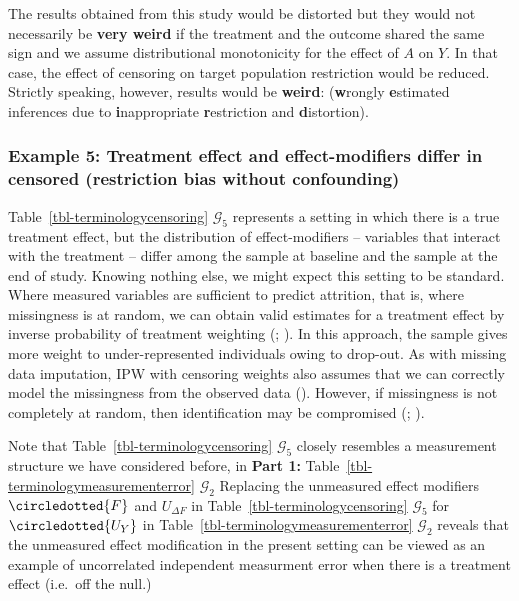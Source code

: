 \documentclass[
  single column]{article}
\begin{document}
The results obtained from this study would be distorted but they would
not necessarily be \textbf{very weird} if the treatment and the outcome
shared the same sign and we assume distributional monotonicity for the
effect of \(A\) on \(Y\). In that case, the effect of censoring on
target population restriction would be reduced. Strictly speaking,
however, results would be \textbf{weird}: (\textbf{w}rongly
\textbf{e}stimated inferences due to \textbf{i}nappropriate
\textbf{r}estriction and \textbf{d}istortion).

\subsubsection{Example 5: Treatment effect and effect-modifiers differ
in censored (restriction bias without
confounding)}\label{example-5-treatment-effect-and-effect-modifiers-differ-in-censored-restriction-bias-without-confounding}

Table~\ref{tbl-terminologycensoring} \(\mathcal{G}_5\) represents a
setting in which there is a true treatment effect, but the distribution
of effect-modifiers -- variables that interact with the treatment --
differ among the sample at baseline and the sample at the end of study.
Knowing nothing else, we might expect this setting to be standard. Where
measured variables are sufficient to predict attrition, that is, where
missingness is at random, we can obtain valid estimates for a treatment
effect by inverse probability of treatment weighting
(;
). In this approach,
the sample gives more weight to under-represented individuals owing to
drop-out. As with missing data imputation, IPW with censoring weights
also assumes that we can correctly model the missingness from the
observed data ().
However, if missingness is not completely at random, then identification
may be compromised (; ).

Note that Table~\ref{tbl-terminologycensoring} \(\mathcal{G}_5\) closely
resembles a measurement structure we have considered before, in
\textbf{Part 1:} Table~\ref{tbl-terminologymeasurementerror}
\(\mathcal{G}_2\) Replacing the unmeasured effect modifiers
\(\circledotted{F}\) and \(U_{\Delta F}\) in
Table~\ref{tbl-terminologycensoring} \(\mathcal{G}_5\) for
\(\circledotted{U_Y}\) in Table~\ref{tbl-terminologymeasurementerror}
\(\mathcal{G}_2\) reveals that the unmeasured effect modification in the
present setting can be viewed as an example of uncorrelated independent
measurment error when there is a treatment effect (i.e.~off the null.)
\end{document}
